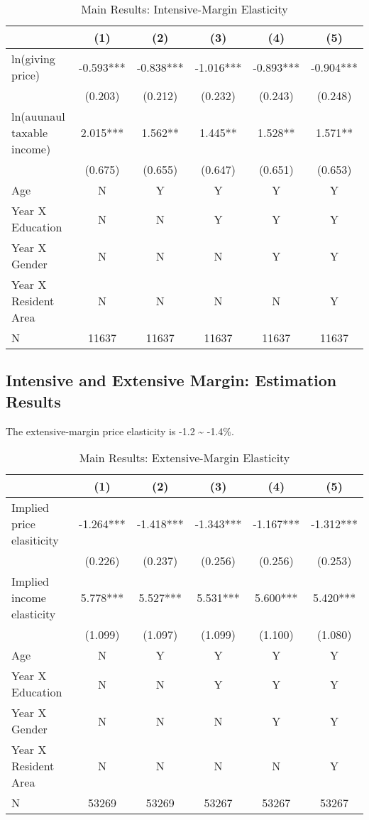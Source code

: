\documentclass[ review  , 3p ]{elsarticle}
\begin{document}
  \begin{table}
  
  \caption{\label{tab:kableEstimateElasticityPart2Slide1}Main Results: Intensive-Margin Elasticity}
  \centering
  \fontsize{7}{9}\selectfont
  \begin{tabular}[t]{lccccc}
  \toprule
   & (1) & (2) & (3) & (4) & (5)\\
  \midrule
  ln(giving price) & -0.593*** & -0.838*** & -1.016*** & -0.893*** & -0.904***\\
   & (0.203) & (0.212) & (0.232) & (0.243) & (0.248)\\
  ln(auunaul taxable income) & 2.015*** & 1.562** & 1.445** & 1.528** & 1.571**\\
   & (0.675) & (0.655) & (0.647) & (0.651) & (0.653)\\
  Age & N & Y & Y & Y & Y\\
  Year X Education & N & N & Y & Y & Y\\
  Year X Gender & N & N & N & Y & Y\\
  Year X Resident Area & N & N & N & N & Y\\
  N & 11637 & 11637 & 11637 & 11637 & 11637\\
  \bottomrule
  \end{tabular}
  \end{table}
  
  \hypertarget{intensive-and-extensive-margin-estimation-results-1}{%
  \subsection{Intensive and Extensive Margin: Estimation Results}\label{intensive-and-extensive-margin-estimation-results-1}}
  
  The extensive-margin price elasticity is -1.2 \textasciitilde{} -1.4\%.
  
  \begin{table}
  
  \caption{\label{tab:kableEstimateElasticityPart2Slide2}Main Results: Extensive-Margin Elasticity}
  \centering
  \fontsize{7}{9}\selectfont
  \begin{tabular}[t]{lccccc}
  \toprule
   & (1) & (2) & (3) & (4) & (5)\\
  \midrule
  Implied price elasiticity & -1.264*** & -1.418*** & -1.343*** & -1.167*** & -1.312***\\
   & (0.226) & (0.237) & (0.256) & (0.256) & (0.253)\\
  Implied income elasticity & 5.778*** & 5.527*** & 5.531*** & 5.600*** & 5.420***\\
   & (1.099) & (1.097) & (1.099) & (1.100) & (1.080)\\
  Age & N & Y & Y & Y & Y\\
  Year X Education & N & N & Y & Y & Y\\
  Year X Gender & N & N & N & Y & Y\\
  Year X Resident Area & N & N & N & N & Y\\
  N & 53269 & 53269 & 53267 & 53267 & 53267\\
  \bottomrule
  \end{tabular}
  \end{table}
  
\end{document}
